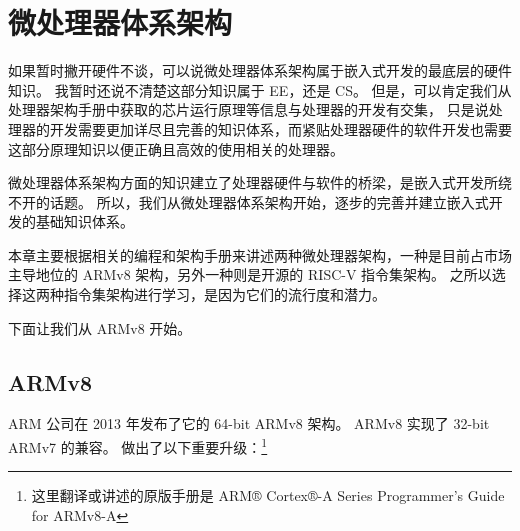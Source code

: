 \chapter{微处理器体系架构}

如果暂时撇开硬件不谈，可以说微处理器体系架构属于嵌入式开发的最底层的硬件知识。
我暂时还说不清楚这部分知识属于 EE，还是 CS。
但是，可以肯定我们从处理器架构手册中获取的芯片运行原理等信息与处理器的开发有交集，
只是说处理器的开发需要更加详尽且完善的知识体系，而紧贴处理器硬件的软件开发也需要这部分原理知识以便正确且高效的使用相关的处理器。

微处理器体系架构方面的知识建立了处理器硬件与软件的桥梁，是嵌入式开发所绕不开的话题。
所以，我们从微处理器体系架构开始，逐步的完善并建立嵌入式开发的基础知识体系。

本章主要根据相关的编程和架构手册来讲述两种微处理器架构，一种是目前占市场主导地位的 ARMv8 架构，另外一种则是开源的 RISC-V 指令集架构。
之所以选择这两种指令集架构进行学习，是因为它们的流行度和潜力。

下面让我们从 ARMv8 开始。

\section{ARMv8}

ARM 公司在 2013 年发布了它的 64-bit ARMv8 架构。
ARMv8 实现了 32-bit ARMv7 的兼容。
做出了以下重要升级：\footnote{
  这里翻译或讲述的原版手册是 {ARM® Cortex®-A Series Programmer’s Guide for ARMv8-A}\cite{armpg}
}


